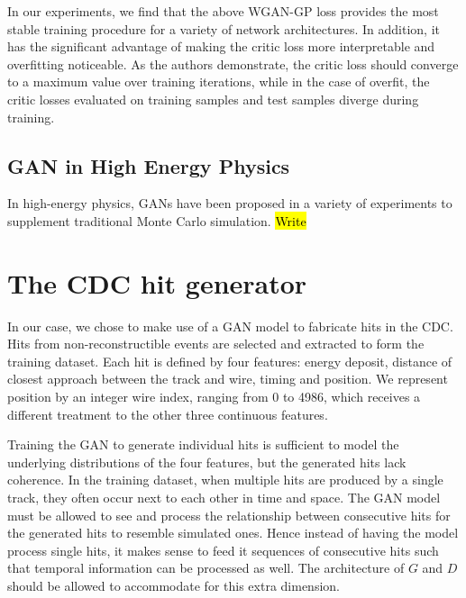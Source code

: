In our experiments, we find that the above WGAN-GP loss provides the most stable training procedure for a variety of network architectures. In addition, it has the significant advantage of making the critic loss more interpretable and overfitting noticeable. As the authors demonstrate, the critic loss should converge to a maximum value over training iterations, while in the case of overfit, the critic losses evaluated on training samples and test samples diverge during training.

\subsection{GAN in High Energy Physics}
In high-energy physics, GANs have been proposed in a variety of experiments to supplement traditional Monte Carlo simulation. 
\hl{Write}

\section{The CDC hit generator}
In our case, we chose to make use of a GAN model to fabricate hits in the CDC.
Hits from non-reconstructible events are selected and extracted to form the training dataset. Each hit is defined by four features: energy deposit, distance of closest approach between the track and wire, timing and position. We represent position by an integer wire index, ranging from 0 to 4986, which receives a different treatment to the other three continuous features.

Training the GAN to generate individual hits is sufficient to model the underlying distributions of the four features, but the generated hits lack coherence. In the training dataset, when multiple hits are produced by a single track, they often occur next to each other in time and space. The GAN model must be allowed to see and process the relationship between consecutive hits for the generated hits to resemble simulated ones. Hence instead of having the model process single hits, it makes sense to feed it sequences of consecutive hits such that temporal information can be processed as well. The architecture of $G$ and $D$ should be allowed to accommodate for this extra dimension.



